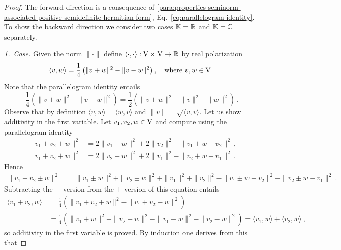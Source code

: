 \begin{proof}
The forward direction is a consequence of
\ref{para:properties-seminorm-associated-positive-semidefinite-hermitian-form}, Eq.~\ref{eq:parallelogram-identity}. 
To show the backward direction we consider two cases $\mathbb{K} = \mathbb{R}$ and 
$\mathbb{K} = \mathbb{C}$ separately.

\textit{1.~Case.} Given the norm $\|\cdot\|$ define $\langle \cdot , \cdot \rangle : \mathrm{V} \times \mathrm{V} \to \mathbb{R}$ by real polarization
\[
   \langle v , w \rangle = \frac 14 \left( \| v + w \|^2  - \| v - w \|^2 \right), \quad \text{where } v,w\in \vectorspV  \ .
\]
Note that the parallelogram identity entails
\[
  \frac 14 \left( \| v + w \|^2  - \| v - w \|^2 \right) =  
  \frac 12 \left( \| v + w \|^2  - \| v \|^2 - \| w \|^2 \right) \ . 
\]
Observe that by definition $\langle v , w \rangle = \langle w , v \rangle$ and $\| v \| = \sqrt{ \langle v , v \rangle}$.
Let us show additivity in the first variable. Let $v_1,v_2,w \in \mathrm{V}$ and compute using the parallelogram identity 
\begin{equation*}
  \begin{split}
     \| v_1 + v_2 + w \|^2 & = 2 \| v_1 + w \|^2 + 2 \| v_2\|^2 -  \| v_1 + w - v_2\|^2 \ , \\ 
     \| v_1 + v_2 + w \|^2 & = 2 \| v_2 + w \|^2 + 2 \| v_1\|^2 -  \| v_2 + w - v_1\|^2 \ .
  \end{split}
\end{equation*}
Hence 
\begin{equation*}
  \begin{split}
     \| v_1 + v_2 \pm w \|^2 & =  
     \| v_1 \pm w \|^2 +  \| v_2 \pm w \|^2 +  \| v_1\|^2 + \| v_2\|^2 -  \| v_1 \pm w - v_2\|^2  -  \| v_2 \pm w - v_1\|^2 \ .
  \end{split}
\end{equation*}
Subtracting the $-$ version from the $+$ version of this equation entails
\begin{equation*}
  \begin{split}
    \langle v_1 + v_2 , w \rangle \, & = \frac 14 \left( \| v_1 + v_2 + w \|^2  - \| v_1 + v_2 - w \|^2 \right)= \\
    & = \frac 14 \left( \| v_1 + w \|^2 +  \| v_2 + w \|^2 -  \| v_1 - w \|^2 -  \| v_2 - w \|^2 \right) =
    \langle v_1  , w \rangle +  \langle v_2 , w \rangle \ ,
  \end{split}
\end{equation*}
so additivity in the first variable is proved. By induction  one derives from this that 

\end{proof}
